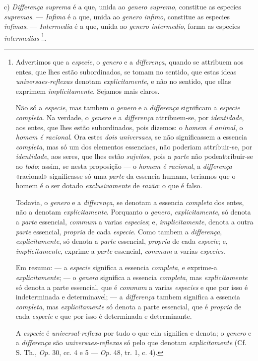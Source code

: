 c) \emph{Differença suprema} é a que, unida ao \emph{genero supremo}, constitue as especies \emph{supremas}. --- \emph{Infima} é a que, unida ao \emph{genero infimo}, constitue as especies \emph{infimas}. --- \emph{Intermedia} é a que, unida ao \emph{genero intermedio}, forma as especies \emph{intermedias} \footnote{Advertimos que a \emph{especie}, o \emph{genero} e a \emph{differença}, quando se attribuem aos entes, que lhes estão subordinados, se tomam no sentido, que estas ideas \emph{universaes-reflexas} denotam \emph{explicitamente}, e não no sentido, que ellas exprimem \emph{implicitamente}. Sejamos mais claros.\par Não só a \emph{especie}, mas tambem o \emph{genero} e a \emph{differença} significam a \emph{especie completa}. Na verdade, o \emph{genero} e a \emph{differença} attribuem-se, por \emph{identidade}, aos entes, que lhes estão subordinados, pois dizemos: o \emph{homem é animal}, o \emph{homem é racional}. Ora estes \emph{dois universaes}, se não significassem a essencia \emph{completa}, mas só um dos elementos essenciaes, não poderiam attribuir-se, por \emph{identidade}, aos seres, que lhes estão \emph{sujeitos}, pois a \emph{parte} não podeattribuir-se ao \emph{todo}; assim, se nesta proposição --- o \emph{homem é racional}, a \emph{differença} «racional» significasse só uma \emph{parte} da essencia humana, teriamos que o homem é o ser dotado \emph{exclusivamente} de \emph{razão}: o que é falso.\par Todavia, o \emph{genero} e a \emph{differença}, se denotam a essencia \emph{completa} dos entes, não a denotam \emph{explicitamente}. Porquanto o \emph{genero}, \emph{explicitamente}, só denota a \emph{parte} essencial, \emph{commum} a varias \emph{especies}; e, \emph{implicitamente}, denota a outra \emph{parte} essencial, \emph{propria} de cada \emph{especie}. Como tambem a \emph{differença}, \emph{explicitamente}, só denota a \emph{parte} essencial, \emph{propria} de cada \emph{especie}; e, \emph{implicitamente}, exprime a \emph{parte} essencial, \emph{commum} a varias \emph{especies}.\par Em resumo: --- a \emph{especie} significa a essencia \emph{completa}, e exprime-a \emph{explicitamente}; --- o \emph{genero} significa a essencia \emph{completa}, mas \emph{explicitamente} só denota a parte essencial, que é \emph{commum} a varias \emph{especies} e que por isso é indeterminada e determinavel; --- a \emph{differença} tambem significa a essencia \emph{completa}, mas \emph{explicitamente} só denota a parte essencial, que é \emph{propria} de cada \emph{especie} e que por isso é determinada e determinante.\par A \emph{especie} é \emph{universal-reflexa} por tudo o que ella significa e denota; o \emph{genero} e a \emph{differença} são \emph{universaes-reflexas} só pelo que denotam \emph{explicitamente} (Cf. S. Th., \emph{Op.} 30, cc. 4 e 5 --- \emph{Op.} 48, tr. 1, c. 4).}.

